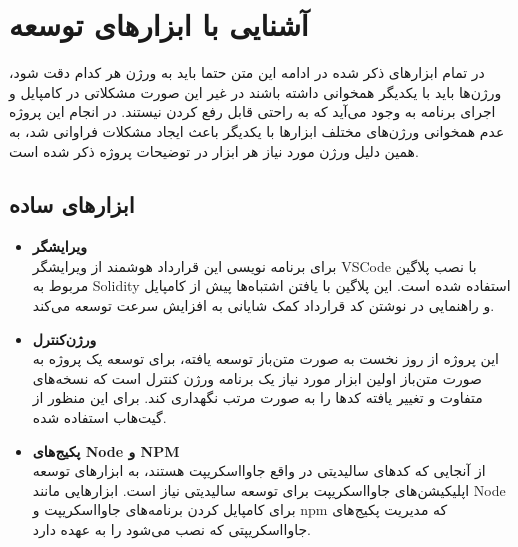 \chapter{آشنایی با ابزار‌های توسعه}
در تمام ابزارهای ذکر شده در ادامه این متن حتما باید به ورژن هر کدام دقت شود، ورژن‌ها باید با یکدیگر همخوانی داشته باشند در غیر این صورت مشکلاتی در کامپایل و اجرای برنامه به وجود می‌آید که به راحتی قابل رفع کردن نیستند. در انجام این پروژه عدم همخوانی ورژن‌های مختلف ابزارها با یکدیگر باعث ایجاد مشکلات فراوانی شد، به همین دلیل ورژن مورد نیاز هر ابزار در توضیحات پروژه ذکر شده است.

\section{ابزارهای ساده}
\begin{itemize}
	\item \textbf{ویرایشگر}\\
	برای برنامه نویسی این قرارداد هوشمند از ویرایشگر VSCode با نصب
	پلاگین مربوط به Solidity
استفاده شده است. این پلاگین با یافتن اشتباه‌ها پیش از کامپایل و راهنمایی در نوشتن کد قرارداد کمک شایانی به افزایش سرعت توسعه می‌کند.

	\item \textbf{ورژن‌کنترل}\\
	این پروژه از روز نخست به صورت متن‌باز توسعه یافته، برای توسعه یک پروژه به صورت متن‌باز اولین ابزار مورد نیاز یک برنامه ورژن کنترل است که نسخه‌های متفاوت و تغییر یافته کدها را به صورت مرتب نگهداری کند. برای این منظور از گیت‌هاب استفاده شده.

	\item \textbf{پکیج‌های Node و NPM}\\
از آنجایی که کدهای سالیدیتی در واقع جاوا‌اسکریپت هستند، به ابزارهای توسعه اپلیکیشن‌های جاوااسکریپت برای توسعه سالیدیتی نیاز است. ابزارهایی مانند Node برای کامپایل کردن برنامه‌های جاوااسکریپت و npm که مدیریت پکیج‌های جاوااسکریپتی که نصب می‌شود را به عهده دارد.

\end{itemize}


